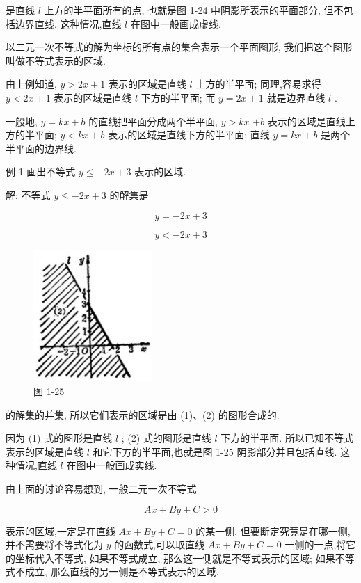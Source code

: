 \documentclass[lang=cn,newtx,10pt,scheme=chinese]{elegantbook}
\begin{document}
是直线 \(l\) 上方的半平面所有的点, 也就是图 1-24 中阴影所表示的平面部分, 但不包括边界直线. 这种情况,直线 \(l\) 在图中一般画成虚线.

以二元一次不等式的解为坐标的所有点的集合表示一个平面图形, 我们把这个图形叫做不等式表示的区域.

由上例知道, \(y > {2x} + 1\) 表示的区域是直线 \(l\) 上方的半平面; 同理,容易求得 \(y < {2x} + 1\) 表示的区域是直线 \(l\) 下方的半平面; 而 \(y = {2x} + 1\) 就是边界直线 \(l\) .

一般地, \(y = {kx} + b\) 的直线把平面分成两个半平面, \(y > {kx}\) \(+ b\) 表示的区域是直线上方的半平面; \(y < {kx} + b\) 表示的区域是直线下方的半平面; 直线 \(y = {kx} + b\) 是两个半平面的边界线.

例 1 画出不等式 \(y \leq - {2x} + 3\) 表示的区域.

解: 不等式 \(y \leq - {2x} + 3\) 的解集是

\[
  y = - {2x} + 3 \tag{1}
\]

\[
  y < - {2x} + 3 \tag{2}
\]

\begin{figure}[h]
  \centering
  \includegraphics[max width=0.4\textwidth]{images/01912cc2-ffb6-728e-9ae7-b113ff05c64b_33_345679.jpg}
  \caption{图 1-25}
\end{figure}



的解集的并集, 所以它们表示的区域是由 (1)、(2) 的图形合成的.

因为 (1) 式的图形是直线 \(l\) ; (2) 式的图形是直线 \(l\) 下方的半平面. 所以已知不等式表示的区域是直线 \(l\) 和它下方的半平面,也就是图 1-25 阴影部分并且包括直线. 这种情况,直线 \(l\) 在图中一般画成实线.

由上面的讨论容易想到, 一般二元一次不等式

\[
    {Ax} + {By} + C > 0
\]

表示的区域,一定是在直线 \({Ax} + {By} + C = 0\) 的某一侧. 但要断定究竟是在哪一侧,并不需要将不等式化为 \(y\) 的函数式,可以取直线 \({Ax} + {By} + C = 0\) 一侧的一点,将它的坐标代入不等式, 如果不等式成立, 那么这一侧就是不等式表示的区域; 如果不等式不成立, 那么直线的另一侧是不等式表示的区域.
\end{document}
